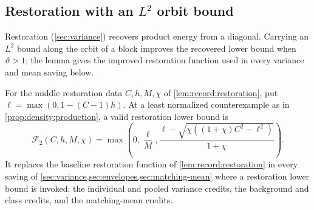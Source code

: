 \subsection{Restoration with an \texorpdfstring{$L^2$}{L\textasciicircum 2} orbit bound}

Restoration (\cref{sec:variance}) recovers product energy from a
diagonal. Carrying an $L^2$ bound along the orbit of a block
improves the recovered lower bound when $\vartheta>1$; the lemma
gives the improved restoration function used in every variance and
mean saving below.

\begin{lemma}\label{lem:density:restoration}
For the middle restoration data $C,h,M,\chi$ of
\cref{lem:record:restoration}, put $\ell=\max(0,1-(C-1)h)$. At a least normalized counterexample as in \cref{prop:density:production}, a valid restoration
lower bound is
\begin{equation}\label{eq:density:restoration}
 \mathcal F_2(C,h,M,\chi)=
 \max\left(0,\frac\ell M,
 \frac{\ell-\sqrt{\chi((1+\chi)C^2-\ell^2)}}{1+\chi}\right).
\end{equation}
It replaces the baseline restoration function of
\cref{lem:record:restoration} in every saving of
\cref{sec:variance,sec:envelopes,sec:matching-mean} where a
restoration lower bound is invoked: the individual and pooled
variance credits, the background and class credits, and the
matching-mean credits.
\end{lemma}

